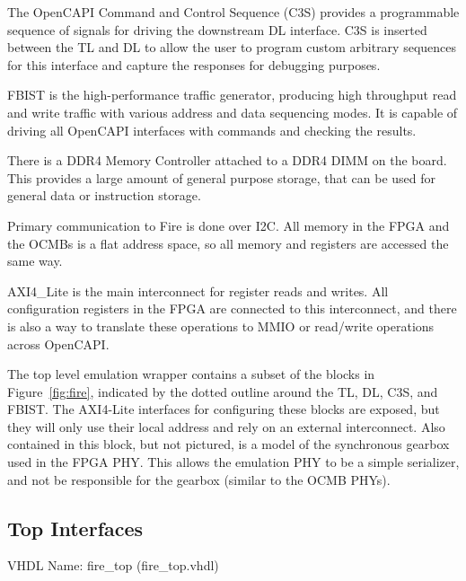 The OpenCAPI Command and Control Sequence (C3S) provides a
programmable sequence of signals for driving the downstream DL
interface. C3S is inserted between the TL and DL to allow the user to
program custom arbitrary sequences for this interface and capture the
responses for debugging purposes.

FBIST is the high-performance traffic generator, producing high
throughput read and write traffic with various address and data
sequencing modes. It is capable of driving all OpenCAPI interfaces
with commands and checking the results.

There is a DDR4 Memory Controller attached to a DDR4 DIMM on the
board. This provides a large amount of general purpose storage, that
can be used for general data or instruction storage.

Primary communication to Fire is done over I2C. All memory in the FPGA
and the OCMBs is a flat address space, so all memory and registers are
accessed the same way.

AXI4\_Lite is the main interconnect for register reads and writes. All
configuration registers in the FPGA are connected to this
interconnect, and there is also a way to translate these operations to
MMIO or read/write operations across OpenCAPI.

\begin{emulation}
The top level emulation wrapper contains a subset of the blocks in
Figure~\ref{fig:fire}, indicated by the dotted outline around the TL,
DL, C3S, and FBIST. The AXI4-Lite interfaces for configuring these
blocks are exposed, but they will only use their local address and
rely on an external interconnect. Also contained in this block, but
not pictured, is a model of the synchronous gearbox used in the FPGA
PHY. This allows the emulation PHY to be a simple serializer, and not
be responsible for the gearbox (similar to the OCMB PHYs).
\end{emulation}

\subsection{Top Interfaces}
VHDL Name: fire\_top (fire\_top.vhdl)


